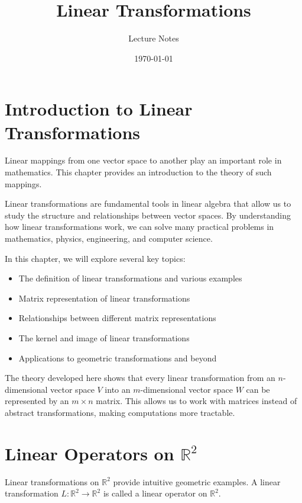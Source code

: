 \documentclass[12pt,a4paper]{article}
\title{\textbf{Linear Transformations}}
\author{Lecture Notes}
\date{\today}
\newcommand{\R}{\mathbb{R}}
\begin{document}
	
	\maketitle
	
	\tableofcontents
	
	\newpage
	
	\section{Introduction to Linear Transformations}
	
	Linear mappings from one vector space to another play an important role in mathematics. This chapter provides an introduction to the theory of such mappings. 
	
	Linear transformations are fundamental tools in linear algebra that allow us to study the structure and relationships between vector spaces. By understanding how linear transformations work, we can solve many practical problems in mathematics, physics, engineering, and computer science.
	
	In this chapter, we will explore several key topics:
	
	\begin{itemize}
		\item The definition of linear transformations and various examples
		\item Matrix representation of linear transformations
		\item Relationships between different matrix representations
		\item The kernel and image of linear transformations
		\item Applications to geometric transformations and beyond
	\end{itemize}
	
	The theory developed here shows that every linear transformation from an $n$-dimensional vector space $V$ into an $m$-dimensional vector space $W$ can be represented by an $m \times n$ matrix. This allows us to work with matrices instead of abstract transformations, making computations more tractable.
	
	\section{Linear Operators on $\R^2$}
	
	Linear transformations on $\R^2$ provide intuitive geometric examples. A linear transformation $L: \R^2 \to \R^2$ is called a linear operator on $\R^2$.
	
\end{document}
